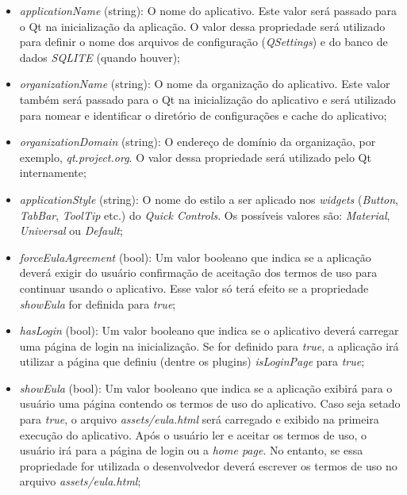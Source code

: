 \begin{itemize}
	\item \textit{applicationName} (string): O nome do aplicativo. Este valor será passado para o Qt na inicialização da aplicação. O valor dessa propriedade será utilizado para definir o nome dos arquivos de configuração (\textit{QSettings}) e do banco de dados \textit{SQLITE} (quando houver);

	\item \textit{organizationName} (string): O nome da organização do aplicativo. Este valor também será passado para o Qt na inicialização do aplicativo e será utilizado para nomear e identificar o diretório de configurações e cache do aplicativo;

	\item \textit{organizationDomain} (string): O endereço de domínio da organização, por exemplo, \textit{qt.project.org}. O valor dessa propriedade será utilizado pelo Qt internamente;

	\item \textit{applicationStyle} (string): O nome do estilo a ser aplicado nos \textit{widgets} (\textit{Button}, \textit{TabBar}, \textit{ToolTip} etc.) do \textit{Quick Controls}. Os possíveis valores são: \textit{Material}, \textit{Universal} ou \textit{Default};

	\item \textit{forceEulaAgreement} (bool): Um valor booleano que indica se a aplicação deverá exigir do usuário confirmação de aceitação dos termos de uso para continuar usando o aplicativo. Esse valor só terá efeito se a propriedade \textit{showEula} for definida para \textit{true};

	\item \textit{hasLogin} (bool): Um valor booleano que indica se o aplicativo deverá carregar uma página de login na inicialização. Se for definido para \textit{true}, a aplicação irá utilizar a página que definiu (dentre os plugins) \textit{isLoginPage} para \textit{true};

	\item \textit{showEula} (bool): Um valor booleano que indica se a aplicação exibirá para o usuário uma página contendo os termos de uso do aplicativo. Caso seja setado para \textit{true}, o arquivo \textit{assets/eula.html} será carregado e exibido na primeira execução do aplicativo. Após o usuário ler e aceitar os termos de uso, o usuário irá para a página de login ou a \textit{home page}. No entanto, se essa propriedade for utilizada o desenvolvedor deverá escrever os termos de uso no arquivo \textit{assets/eula.html};


\end{itemize}
